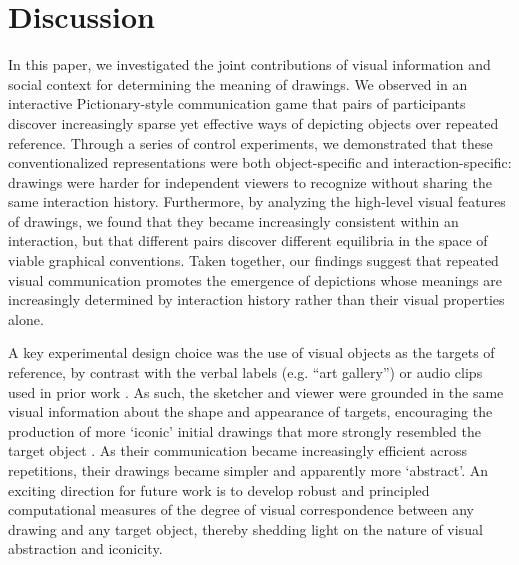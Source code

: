 \documentclass[10pt,letterpaper]{article}
\begin{document}
\section{Discussion}

In this paper, we investigated the joint contributions of visual information and social context for determining the meaning of drawings.
We observed in an interactive Pictionary-style communication game that pairs of participants discover increasingly sparse yet effective ways of depicting objects over repeated reference.
Through a series of control experiments, we demonstrated that these conventionalized representations were both object-specific and interaction-specific: drawings were harder for independent viewers to recognize without sharing the same interaction history.
Furthermore, by analyzing the high-level visual features of drawings, we found that they became increasingly consistent within an interaction, but that different pairs discover different equilibria in the space of viable graphical conventions.
Taken together, our findings suggest that repeated visual communication promotes the emergence of depictions whose meanings are increasingly determined by interaction history rather than their visual properties alone.

A key experimental design choice was the use of visual objects as the targets of reference, by contrast with the verbal labels (e.g. ``art gallery'') or audio clips used in prior work \cite{GalantucciGarrod11_ExperimentalSemiotics,fay2010interactive}. %
As such, the sketcher and viewer were grounded in the same visual information about the shape and appearance of targets, encouraging the production of more `iconic' initial drawings that more strongly resembled the target object \cite{verhoef2016iconicity,perlman2015iconicity}.
As their communication became increasingly efficient across repetitions, their drawings became simpler and apparently more `abstract'.
An exciting direction for future work is to develop robust and principled computational measures of the degree of visual correspondence between any drawing and any target object, thereby shedding light on the nature of visual abstraction and iconicity.
\end{document}

